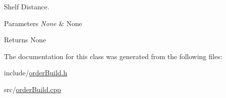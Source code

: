 Shelf Distance. 


\begin{DoxyParams}{Parameters}
{\em None} & None \\
\hline
\end{DoxyParams}
\begin{DoxyReturn}{Returns}
None 
\end{DoxyReturn}


The documentation for this class was generated from the following files\+:\begin{DoxyCompactItemize}
\item 
include/\hyperlink{orderBuild_8h}{order\+Build.\+h}\item 
src/\hyperlink{orderBuild_8cpp}{order\+Build.\+cpp}\end{DoxyCompactItemize}
